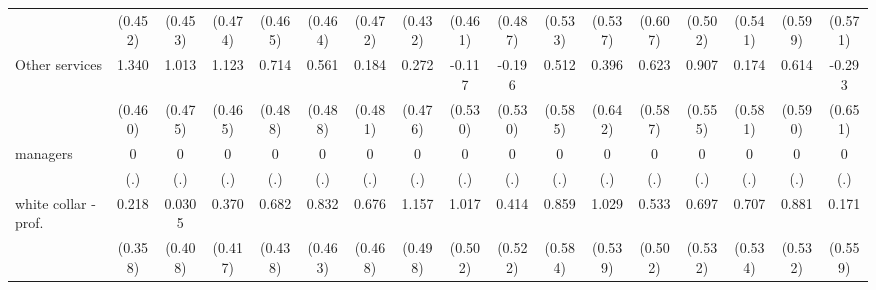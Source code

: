 {\begin{tabular}{l*{16}{c}}
                    &     (0.452)         &     (0.453)         &     (0.474)         &     (0.465)         &     (0.464)         &     (0.472)         &     (0.432)         &     (0.461)         &     (0.487)         &     (0.533)         &     (0.537)         &     (0.607)         &     (0.502)         &     (0.541)         &     (0.599)         &     (0.571)         \\
[1em]
Other services      &       1.340\sym{**} &       1.013\sym{*}  &       1.123\sym{*}  &       0.714         &       0.561         &       0.184         &       0.272         &      -0.117         &      -0.196         &       0.512         &       0.396         &       0.623         &       0.907         &       0.174         &       0.614         &      -0.293         \\
                    &     (0.460)         &     (0.475)         &     (0.465)         &     (0.488)         &     (0.488)         &     (0.481)         &     (0.476)         &     (0.530)         &     (0.530)         &     (0.585)         &     (0.642)         &     (0.587)         &     (0.555)         &     (0.581)         &     (0.590)         &     (0.651)         \\
[1em]
managers            &           0         &           0         &           0         &           0         &           0         &           0         &           0         &           0         &           0         &           0         &           0         &           0         &           0         &           0         &           0         &           0         \\
                    &         (.)         &         (.)         &         (.)         &         (.)         &         (.)         &         (.)         &         (.)         &         (.)         &         (.)         &         (.)         &         (.)         &         (.)         &         (.)         &         (.)         &         (.)         &         (.)         \\
[1em]
white collar - prof.&       0.218         &      0.0305         &       0.370         &       0.682         &       0.832         &       0.676         &       1.157\sym{*}  &       1.017\sym{*}  &       0.414         &       0.859         &       1.029         &       0.533         &       0.697         &       0.707         &       0.881         &       0.171         \\
                    &     (0.358)         &     (0.408)         &     (0.417)         &     (0.438)         &     (0.463)         &     (0.468)         &     (0.498)         &     (0.502)         &     (0.522)         &     (0.584)         &     (0.539)         &     (0.502)         &     (0.532)         &     (0.534)         &     (0.532)         &     (0.559)         \\

\end{tabular}}
